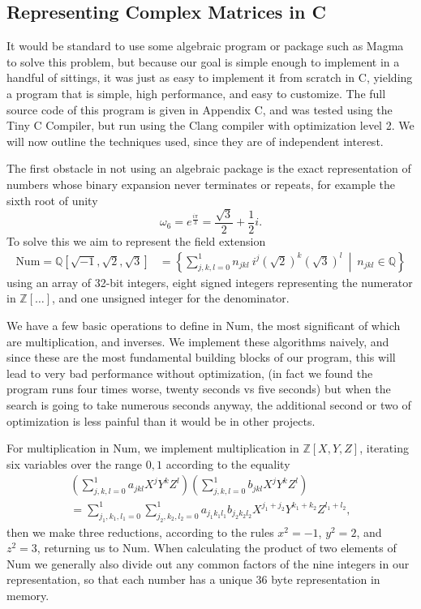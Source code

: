 \subsection{Representing Complex Matrices in C}
It would be standard to use some algebraic program or package such as Magma to solve this problem, but because our goal is simple enough to implement in a handful of sittings, it was just as easy to implement it from scratch in C, yielding a program that is simple, high performance, and easy to customize. The full source code of this program is given in Appendix C, and was tested using the Tiny C Compiler, but run using the Clang compiler with optimization level 2. We will now outline the techniques used, since they are of independent interest. 

The first obstacle in not using an algebraic package is the exact representation of numbers whose binary expansion never terminates or repeats, for example the sixth root of unity
\[\omega_6 = e^{\frac{i\pi}{3}} = \frac{\sqrt{3}}{2} + \frac{1}{2}i.\]
To solve this we aim to represent the field extension
\begin{align*}
	\text{Num} = \mathbb{Q}[\sqrt{-1}, \sqrt{2}, \sqrt{3}]
	&= \left\{ \sum_{j,k,l = 0}^1 n_{jkl}\ i^j\left(\sqrt{2}\right)^k\left(\sqrt{3}\right)^l
	\ \middle|\ n_{jkl} \in \mathbb{Q}\right\}
\end{align*}
using an array of 32-bit integers, eight signed integers representing the numerator in $\mathbb{Z}[\dots]$, and one unsigned integer for the denominator.

We have a few basic operations to define in Num, the most significant of which are multiplication, and inverses. We implement these algorithms naively, and since these are the most fundamental building blocks of our program, this will lead to very bad performance without optimization, (in fact we found the program runs four times worse, twenty seconds vs five seconds) but when the search is going to take numerous seconds anyway, the additional second or two of optimization is less painful than it would be in other projects.

For multiplication in Num, we implement multiplication in $\mathbb{Z}[X, Y, Z]$, iterating six variables over the range ${0, 1}$ according to the equality
\begin{align*}
	\left(\sum_{j,k,l = 0}^1 a_{jkl}X^jY^kZ^l\right)\left(\sum_{j,k,l = 0}^1 b_{jkl}X^jY^kZ^l\right)
	\\= \sum_{j_1,k_1,l_1=0}^1\sum_{j_2,k_2,l_2=0}^1 a_{j_1k_1l_1}b_{j_2k_2l_2}X^{j_1+j_2}Y^{k_1+k_2}Z^{l_1+l_2},
\end{align*}
then we make three reductions, according to the rules $x^2 = -1$, $y^2 = 2$, and $z^2 = 3$, returning us to Num. When calculating the product of two elements of Num we generally also divide out any common factors of the nine integers in our representation, so that each number has a unique 36 byte representation in memory.

